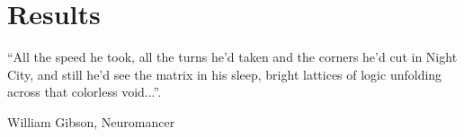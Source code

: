 \chapter{Results}
\label{chapter:research-proposal}
\epigraph{``All the speed he took, all the turns he'd taken and the corners  he'd cut in Night City, and still he'd see the  matrix in his sleep, bright lattices of logic unfolding across that colorless void...''. }{\vspace{10pt} William Gibson, Neuromancer}

\newpage





%



%

